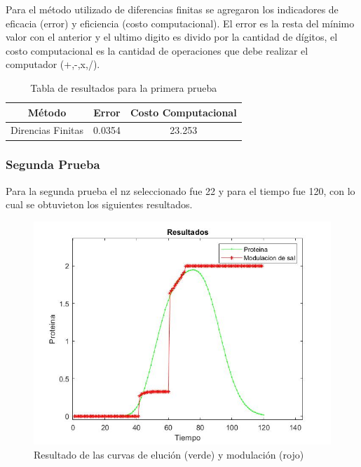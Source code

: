\par Para el método utilizado de diferencias finitas se agregaron los indicadores de eficacia (error) y eficiencia (costo computacional). El error es la resta del mínimo valor con el anterior y el ultimo digito es divido por la cantidad de dígitos, el costo computacional es la cantidad de operaciones que debe realizar el computador (+,-,x,/).

\begin{table}[htp]
	\centering
	\begin{tabular}{ |c|c|c|}
		\hline
		\textbf{Método} & \textbf{Error} & \textbf{Costo Computacional}  \\
		\hline
		Direncias Finitas & 0.0354 &  23.253 \\
		\hline
	\end{tabular}
	\caption{Tabla de resultados para la primera prueba}
	\label{tab:tab3}
\end{table}

\newpage

\subsubsection{Segunda Prueba}

\par Para la segunda prueba el nz seleccionado fue 22 y para el tiempo fue 120, con lo cual se obtuvieton los siguientes resultados.

\begin{figure}[!ht]
	\centering
	\includegraphics[scale=0.4]{Imagenes/graficoem2.jpg}
	\caption{Resultado de las curvas de elución (verde) y modulación (rojo)}
	\label{fig:ej}
\end{figure}

